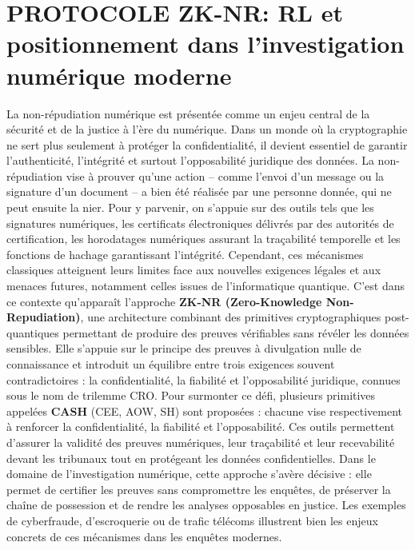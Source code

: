 \documentclass[11pt,a4paper]{article}
\begin{document}
	\newpage
	
	\section{ PROTOCOLE ZK-NR: RL et
		positionnement dans l'investigation numérique moderne}
	
	\vspace{0.5cm}
	La non-répudiation numérique est présentée comme un enjeu central de la sécurité et de la justice à l’ère du numérique. Dans un monde où la cryptographie ne sert plus seulement à protéger la confidentialité, il devient essentiel de garantir l’authenticité, l’intégrité et surtout l’opposabilité juridique des données. La non-répudiation vise à prouver qu’une action – comme l’envoi d’un message ou la signature d’un document – a bien été réalisée par une personne donnée, qui ne peut ensuite la nier. Pour y parvenir, on s’appuie sur des outils tels que les signatures numériques, les certificats électroniques délivrés par des autorités de certification, les horodatages numériques assurant la traçabilité temporelle et les fonctions de hachage garantissant l’intégrité. Cependant, ces mécanismes classiques atteignent leurs limites face aux nouvelles exigences légales et aux menaces futures, notamment celles issues de l’informatique quantique. C’est dans ce contexte qu’apparaît l’approche \textbf{ ZK-NR (Zero-Knowledge Non-Repudiation)}, une architecture combinant des primitives cryptographiques post-quantiques permettant de produire des preuves vérifiables sans révéler les données sensibles. Elle s’appuie sur le principe des preuves à divulgation nulle de connaissance et introduit un équilibre entre trois exigences souvent contradictoires : la confidentialité, la fiabilité et l’opposabilité juridique, connues sous le nom de trilemme CRO. Pour surmonter ce défi, plusieurs primitives appelées \textbf{CASH} (CEE, AOW, SH) sont proposées : chacune vise respectivement à renforcer la confidentialité, la fiabilité et l’opposabilité. Ces outils permettent d’assurer la validité des preuves numériques, leur traçabilité et leur recevabilité devant les tribunaux tout en protégeant les données confidentielles. Dans le domaine de l’investigation numérique, cette approche s’avère décisive : elle permet de certifier les preuves sans compromettre les enquêtes, de préserver la chaîne de possession et de rendre les analyses opposables en justice. Les exemples de cyberfraude, d’escroquerie ou de trafic télécoms illustrent bien les enjeux concrets de ces mécanismes dans les enquêtes modernes. 
	
\end{document}
